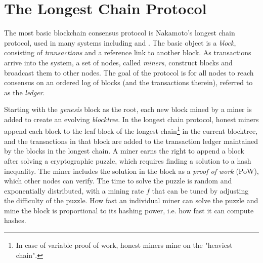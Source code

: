 \section{The Longest Chain Protocol}
\label{sec:background}





The most basic blockchain consensus protocol is Nakamoto's longest chain protocol, used in many systems including \bitcoin and \ethereum.  The basic object is a {\em block}, consisting of {\em transactions} and a reference link to another block. 
As transactions arrive into the system, a set of nodes, called {\em miners}, construct blocks and broadcast them to other nodes. The goal of the protocol is for all nodes to reach consensus on an ordered log of blocks (and the transactions therein), referred to as the {\em ledger}.

Starting with the {\em genesis} block as the root, each new block mined by a miner is added to create an evolving {\em blocktree}. In the longest chain protocol, honest miners append each block to the leaf block of the longest chain\footnote{In case of variable proof of work, honest miners mine on the "heaviest chain".} in the current blocktree, and the transactions in that block are added to the transaction ledger maintained by the blocks in the longest chain. 
A miner earns the right to append a block after solving a cryptographic puzzle, which requires finding a solution to a hash inequality.
 The miner includes the solution in the block as a {\em proof of work} (PoW), which other nodes can verify.  The time to solve the puzzle is random and exponentially distributed, with a mining rate $f$ that can be tuned by adjusting the difficulty of the puzzle. How fast an individual miner can solve the puzzle and mine the block is proportional to its hashing power, i.e. how fast it can compute hashes. 
 
